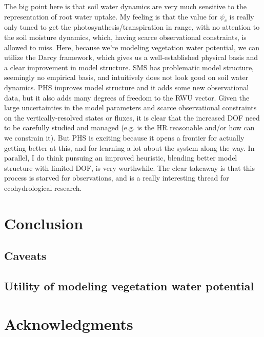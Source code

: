 \documentclass[draft,linenumbers]{agujournal}
\begin{document}
The big point here is that soil water dynamics are very much sensitive to the representation of root water uptake.
My feeling is that the value for $\psi_c$ is really only tuned to get the photosynthesis/transpiration in range, 
with no attention to the soil moisture dynamics, which, having scarce observational constraints, is allowed to miss.
Here, because we're modeling vegetation water potential, we can utilize the Darcy framework, which gives us a well-established physical basis and a clear improvement in model structure.
SMS has problematic model structure, seemingly no empirical basis, and intuitively does not look good on soil water dynamics.
PHS improves model structure and it adds some new observational data, but it also adds many degrees of freedom to the RWU vector. 
Given the large uncertainties in the model parameters and scarce observational constraints on the vertically-resolved states or fluxes, 
it is clear that the increased DOF need to be carefully studied and managed (e.g. is the HR reasonable and/or how can we constrain it).
But PHS is exciting because it opens a frontier for actually getting better at this, and for learning a lot about the system along the way.
In parallel, I do think pursuing an improved heuristic, blending better model structure with limited DOF, is very worthwhile.
The clear takeaway is that this process is starved for observations, and is a really interesting thread for ecohydrological research.

\section{Conclusion}

\subsection{Caveats}

\subsection{Utility of modeling vegetation water potential}

\section{Acknowledgments}

\clearpage    
\end{document}
